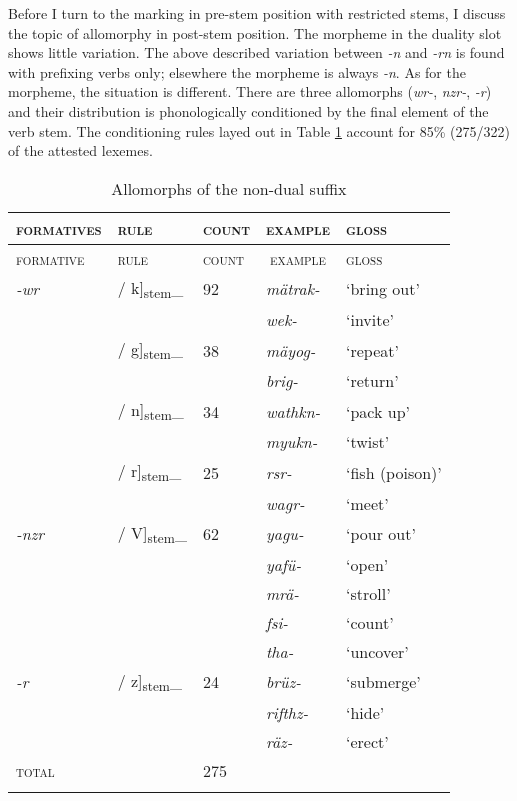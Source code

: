 Before I turn to the  marking in pre-stem position with restricted stems, I discuss the topic of allomorphy in post-stem position. The  morpheme in the duality slot shows little variation. The above described variation between \emph{-n} and \emph{-rn} is found with prefixing verbs only; elsewhere the  morpheme is always \emph{-n}. As for the  morpheme, the situation is different. There are three allomorphs (\emph{wr-}, \emph{nzr-}, \emph{-r}) and their distribution is phonologically conditioned by the final element of the verb stem. The conditioning rules layed out in Table \ref{allonondual} account for 85\% (275/322) of the attested  lexemes.

\begin{table}
	\caption{Allomorphs of the non-dual suffix}
\begin{tabularx}{\textwidth}{lllll}
	\label{allonondual}\\
	\lsptoprule
	\textsc{formatives} & \textsc{rule} &\textsc{count}& \multicolumn{1}{c}{\textsc{example}}& \textsc{gloss}\\
	\hline
	\textsc{formative} & \textsc{rule} &\textsc{count}& \multicolumn{1}{c}{\textsc{example}}& \textsc{gloss}\\
	\hline
	\emph{-wr}& / k]\textsubscript{\tiny{stem}}\_&92& \emph{mätrak-}& `bring out'\\
	&&& \emph{wek-}&`invite'\\
	& / g]\textsubscript{\tiny{stem}}\_	&38& \emph{mäyog-}& `repeat'\\
	&&& \emph{brig-}&`return'\\
	& / n]\textsubscript{\tiny{stem}}\_	&34& \emph{wathkn-}& `pack up'\\
	&&& \emph{myukn-}&`twist'\\
	& / r]\textsubscript{\tiny{stem}}\_	&25& \emph{rsr-}& `fish (poison)'\\
	&&& \emph{wagr-}&`meet'\\\hline
	\emph{-nzr}	& / V]\textsubscript{\tiny{stem}}\_&62& \emph{yagu-}& `pour out'\\
	&&& \emph{yafü-}& `open'\\
	&&& \emph{mrä-}& `stroll'\\
	&&& \emph{fsi-}& `count'\\
	&&& \emph{tha-}& `uncover'\\\hline
	\emph{-r}& / z]\textsubscript{\tiny{stem}}\_&24& \emph{brüz-}& `submerge'\\
	&&& \emph{rifthz-}& `hide'\\
	&&& \emph{räz-}& `erect'\\\hline
	\textsc{total}&&275&&\\
	\lspbottomrule
\end{tabularx}%
\end{table}


